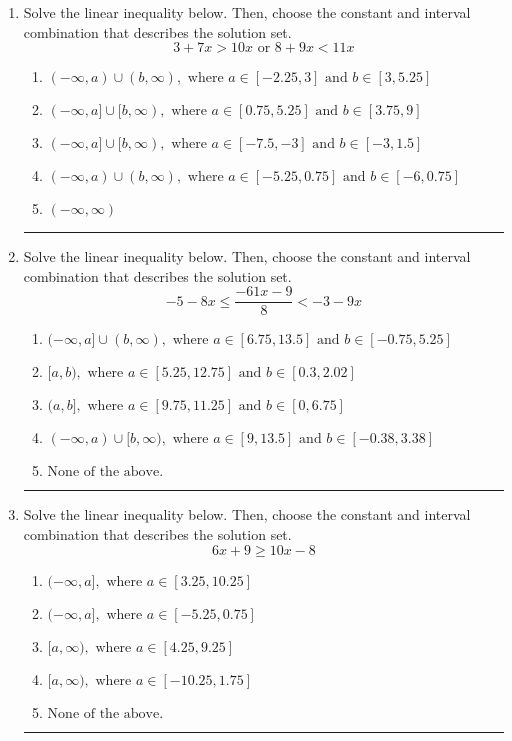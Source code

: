 \documentclass[14pt]{extbook}
\newcommand{\litem}[1]{\item#1\hspace*{-1cm}\rule{\textwidth}{0.4pt}}
\begin{document}
\begin{enumerate}
{\begin{enumerate}[label=\Alph*.]
\end{enumerate} }
\litem{
Solve the linear inequality below. Then, choose the constant and interval combination that describes the solution set.\[ 3 + 7 x > 10 x \text{ or } 8 + 9 x < 11 x \]\begin{enumerate}[label=\Alph*.]
\item \( (-\infty, a) \cup (b, \infty), \text{ where } a \in [-2.25, 3] \text{ and } b \in [3, 5.25] \)
\item \( (-\infty, a] \cup [b, \infty), \text{ where } a \in [0.75, 5.25] \text{ and } b \in [3.75, 9] \)
\item \( (-\infty, a] \cup [b, \infty), \text{ where } a \in [-7.5, -3] \text{ and } b \in [-3, 1.5] \)
\item \( (-\infty, a) \cup (b, \infty), \text{ where } a \in [-5.25, 0.75] \text{ and } b \in [-6, 0.75] \)
\item \( (-\infty, \infty) \)

\end{enumerate} }
\litem{
Solve the linear inequality below. Then, choose the constant and interval combination that describes the solution set.\[ -5 - 8 x \leq \frac{-61 x - 9}{8} < -3 - 9 x \]\begin{enumerate}[label=\Alph*.]
\item \( (-\infty, a] \cup (b, \infty), \text{ where } a \in [6.75, 13.5] \text{ and } b \in [-0.75, 5.25] \)
\item \( [a, b), \text{ where } a \in [5.25, 12.75] \text{ and } b \in [0.3, 2.02] \)
\item \( (a, b], \text{ where } a \in [9.75, 11.25] \text{ and } b \in [0, 6.75] \)
\item \( (-\infty, a) \cup [b, \infty), \text{ where } a \in [9, 13.5] \text{ and } b \in [-0.38, 3.38] \)
\item \( \text{None of the above.} \)

\end{enumerate} }
\litem{
Solve the linear inequality below. Then, choose the constant and interval combination that describes the solution set.\[ 6x + 9 \geq 10x -8 \]\begin{enumerate}[label=\Alph*.]
\item \( (-\infty, a], \text{ where } a \in [3.25, 10.25] \)
\item \( (-\infty, a], \text{ where } a \in [-5.25, 0.75] \)
\item \( [a, \infty), \text{ where } a \in [4.25, 9.25] \)
\item \( [a, \infty), \text{ where } a \in [-10.25, 1.75] \)
\item \( \text{None of the above}. \)


\end{enumerate}}
\end{enumerate}
\end{document}
